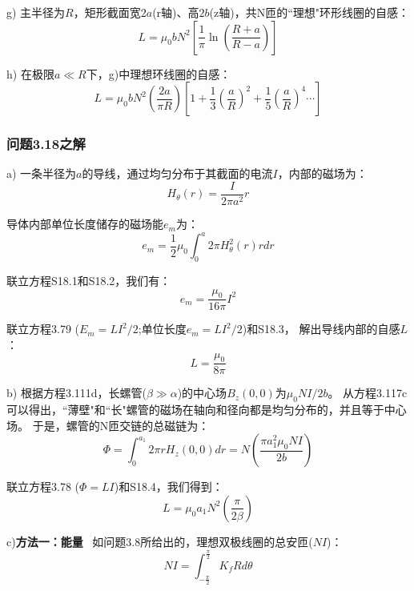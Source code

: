 g) 主半径为$R$，矩形截面宽$2a$(r轴)、高$2b$(z轴)，共N匝的``理想"环形线圈的自感：
 \begin{equation*}%
L=\mu_0 b N^2\left[\frac{1}{\pi}\ln\left(\frac{R+a}{R-a}\right)\right] \tag{3.90a}
\end{equation*}

h) 在极限$a\ll R$下，g)中理想环线圈的自感：
 \begin{equation*}%
L=\mu_0bN^2(\frac{2a}{\pi R})[1+\frac{1}{3}(\frac{a}{R})^2+\frac{1}{5}(\frac{a}{R})^4\cdots] \tag{3.90b}
\end{equation*}

\subsubsection{问题3.18之解}
a) 一条半径为$a$的导线，通过均匀分布于其截面的电流$I$，内部的磁场为：
 \begin{equation*}%
H_\theta(r)=\frac{I}{2\pi a^2}r \tag{S18.1}
\end{equation*}

导体内部单位长度储存的磁场能$e_m$为：
 \begin{equation*}%
e_m=\frac{1}{2}\mu_0\int_{0}^{a}2\pi H_{\theta}^{2}(r)rdr \tag{S18.2}
\end{equation*}

联立方程S18.1和S18.2，我们有：
 \begin{equation*}%
e_m=\frac{\mu_0}{16\pi}I^2 \tag{S18.3}
\end{equation*}

联立方程3.79 ($E_m =LI^2/2$;单位长度$e_m =LI^2/2$)和S18.3，
解出导线内部的自感$L$：
 \begin{equation*}%
L=\frac{\mu_0}{8\pi} \tag{3.83}
\end{equation*}

b) 根据方程3.111d，长螺管($\beta\gg\alpha$)的中心场$B_z(0, 0)$为$\mu_0 NI/2b$。
从方程3.117c可以得出，``薄壁"和``长"螺管的磁场在轴向和径向都是均匀分布的，并且等于中心场。
于是，螺管的N匝交链的总磁链为：
 \begin{equation*}%
\Phi=\int_{0}^{a_1}2\pi rH_z(0,0)dr=N\left(\frac{\pi a_{1}^{2}\mu_0NI}{2b}\right) \tag{S18.4}
\end{equation*}

联立方程3.78 ($\Phi=LI$)和S18.4，我们得到：
 \begin{equation*}%
L=\mu_0a_1N^2(\frac{\pi}{2\beta}) \tag{3.84c}
\end{equation*}

c)\textbf{方法一：能量} \ 如问题3.8所给出的，理想双极线圈的总安匝($NI$)：
\begin{equation*}%
NI=\int_{-\frac{\pi}{2}}^{\frac{\pi}{2}}K_f Rd\theta \tag{S18.5}
\end{equation*}

